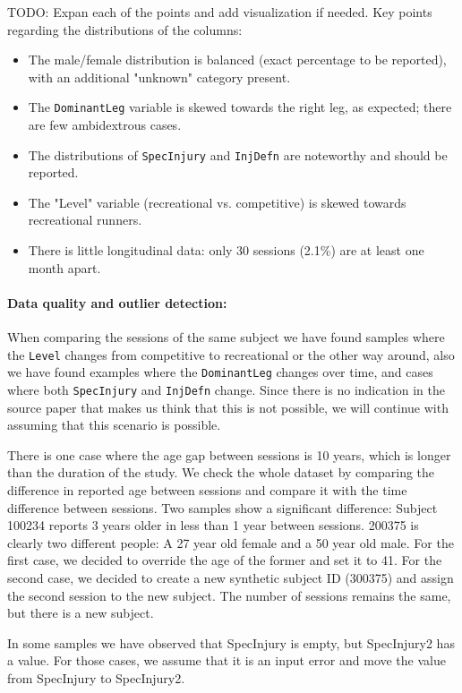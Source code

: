 TODO: Expan each of the points and add visualization if needed.
Key points regarding the distributions of the columns:
\begin{itemize}
    \item The male/female distribution is balanced (exact percentage to be reported), with an additional "unknown" category present.
    \item The \texttt{DominantLeg} variable is skewed towards the right leg, as expected; there are few ambidextrous cases.
    \item The distributions of \texttt{SpecInjury} and \texttt{InjDefn} are noteworthy and should be reported.
    \item The "Level" variable (recreational vs. competitive) is skewed towards recreational runners.
    \item There is little longitudinal data: only 30 sessions (2.1\%) are at least one month apart.
\end{itemize}

\paragraph{Data quality and outlier detection:}
When comparing the sessions of the same subject we have found samples where the \texttt{Level} changes from competitive to recreational or the other way around, also we have found examples where the \texttt{DominantLeg} changes over time, and cases where both \texttt{SpecInjury} and \texttt{InjDefn} change. Since there is no indication in the source paper that makes us think that this is not possible, we will continue with assuming that this scenario is possible.

There is one case where the age gap between sessions is 10 years, which is longer than the duration of the study. We check the whole dataset by comparing the difference in reported age  between sessions and compare it with the time difference between sessions. Two samples show a significant difference: Subject 100234 reports 3 years older in less than 1 year between sessions. 200375 is clearly two different people: A 27 year old female and a 50 year old male. For the first case, we decided to override the age of the former and set it to 41. For the second case, we decided to create a new synthetic subject ID (300375) and assign the second session to the new subject. The number of sessions remains the same, but there is a new subject.

In some samples we have observed that SpecInjury is empty, but SpecInjury2 has a value. For those cases, we assume that it is an input error and move the value from SpecInjury to SpecInjury2.

